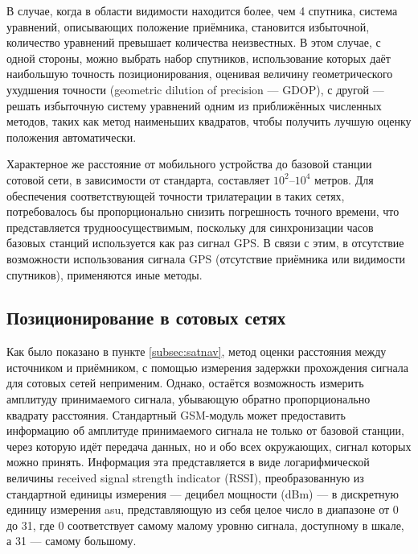 В случае, когда в области видимости находится более, чем 4 спутника, система уравнений, описывающих положение приёмника, становится избыточной, количество уравнений превышает количества неизвестных. В этом случае, с одной стороны, можно выбрать набор спутников, использование которых даёт наибольшую точность позиционирования, оценивая величину геометрического ухудшения точности (geometric dilution of precision --- GDOP), с другой --- решать избыточную систему уравнений одним из приближённых численных методов, таких как метод наименьших квадратов, чтобы получить лучшую оценку положения автоматически\cite{enwikigps}.

Характерное же расстояние от мобильного устройства до базовой станции сотовой сети, в зависимости от стандарта, составляет $10^2$--$10^4$ метров. Для обеспечения соответствующей точности трилатерации в таких сетях, потребовалось бы пропорционально снизить погрешность точного времени, что представляется трудноосуществимым, поскольку для синхронизации часов базовых станций используется как раз сигнал GPS\cite{gsmclockcalibr}. В связи с этим, в отсутствие возможности использования сигнала GPS (отсутствие приёмника или видимости спутников), применяются иные методы.

\subsection{Позиционирование в сотовых сетях}
Как было показано в пункте \ref{subsec:satnav}, метод оценки расстояния между источником и приёмником, с помощью измерения задержки прохождения сигнала для сотовых сетей неприменим. Однако, остаётся возможность измерить амплитуду принимаемого сигнала, убывающую обратно пропорционально квадрату расстояния. Стандартный GSM-модуль может предоставить информацию об амплитуде принимаемого сигнала не только от базовой станции, через которую идёт передача данных, но и обо всех окружающих, сигнал которых можно принять. Информация эта представляется в виде логарифмической величины received signal strength indicator (RSSI), преобразованную из стандартной единицы измерения --- децибел мощности (dBm) --- в дискретную единицу измерения asu, представляющую из себя целое число в диапазоне от 0 до 31, где 0 соответствует самому малому уровню сигнала, доступному в шкале, а 31 --- самому большому\cite{androidnecelinf}.

